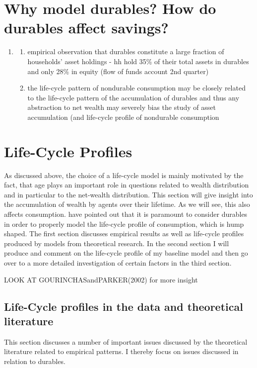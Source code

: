 \documentclass[a4paper,12pt]{article}
\begin{document}
\section{Why model durables? How do durables affect savings?}
\begin{enumerate}
\item \cite{FV&K2011} 
\begin{enumerate}
\item empirical observation that durables constitute a large fraction of households' asset holdings - hh hold 35\% of their total assets in durables and only 28\% in equity (flow of funds account 2nd quarter) 
\item the life-cycle pattern of nondurable consumption may be closely related to the life-cycle pattern of the accumulation of durables and thus any abstraction to net wealth may severely bias the study of asset accumulation (and life-cycle profile of nondurable consumption
\end{enumerate}
\end{enumerate}


\section{Life-Cycle Profiles}
As discussed above, the choice of a life-cycle model is mainly motivated by the fact, that age plays an important role in questions related to wealth distribution and in particular to the net-wealth distribution. This section will give insight into the accumulation of wealth by agents over their lifetime. As we will see, this also affects consumption. \cite{FV&K2011} have pointed out that it is paramount to consider durables in order to properly model the life-cycle profile of consumption, which is hump shaped. The first section discusses empirical results as well as life-cycle profiles produced by models from theoretical research. In the second section I will produce and comment on the life-cycle profile of my baseline model and then go over to a more detailed investigation of certain factors in the third section. 

LOOK AT GOURINCHASandPARKER(2002) for more insight

\subsection{Life-Cycle profiles in the data and theoretical literature}

This section discusses a number of important issues discussed by the theoretical literature related to empirical patterns. I thereby focus on issues discussed in relation to durables. 
\end{document}
